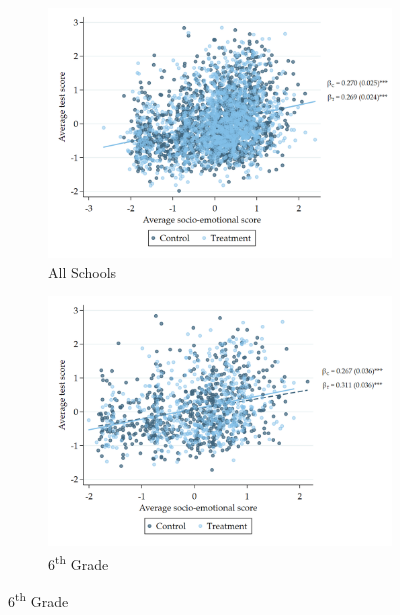 \documentclass[11pt,a4paper]{article}
\begin{document}
\begin{figure}[htbp]

    \caption{Scatter Plot of Cognitive and Socio-Emotional Skills}
    \label{fig:scatter_test_socio}
    
    \begin{subfigure}{\textwidth}
        \caption{All Schools}
        \label{fig:scatter_test_socio_all}
        \raggedleft
        \includegraphics[width=15cm]{DataWork/Output/Figures/figA8a-scatter_test_socio.png}
    \end{subfigure}
    
    \begin{subfigure}{\textwidth}
        \caption{6\textsuperscript{th} Grade}
        \label{fig:scatter_test_socio_grade6}
        \raggedleft
        \includegraphics[width=15cm]{DataWork/Output/Figures/figA8b-scatter_test_socio_grade6.png}
    \end{subfigure}
    

\end{figure}
\end{document}
